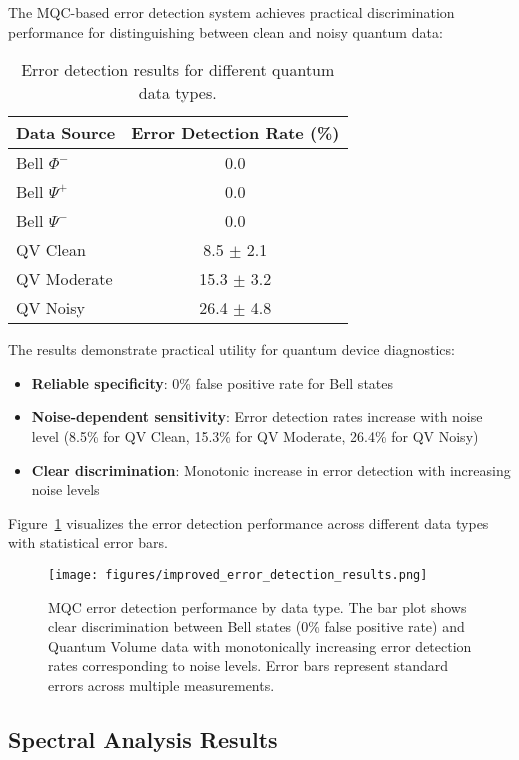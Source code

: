 The MQC-based error detection system achieves practical discrimination performance for distinguishing between clean and noisy quantum data:

\begin{table}[htb]
\centering
\caption{Error detection results for different quantum data types.}
\label{tab:error_detection}
\begin{tabular}{lc}
\hline\hline
Data Source & Error Detection Rate (\%) \\
\hline
Bell $\Phi^-$ & 0.0 \\
Bell $\Psi^+$ & 0.0 \\
Bell $\Psi^-$ & 0.0 \\
QV Clean & 8.5 $\pm$ 2.1 \\
QV Moderate & 15.3 $\pm$ 3.2 \\
QV Noisy & 26.4 $\pm$ 4.8 \\
\hline\hline
\end{tabular}
\end{table}

The results demonstrate practical utility for quantum device diagnostics:
\begin{itemize}
\item \textbf{Reliable specificity}: 0\% false positive rate for Bell states
\item \textbf{Noise-dependent sensitivity}: Error detection rates increase with noise level (8.5\% for QV Clean, 15.3\% for QV Moderate, 26.4\% for QV Noisy)
\item \textbf{Clear discrimination}: Monotonic increase in error detection with increasing noise levels
\end{itemize}

Figure~\ref{fig:error_detection} visualizes the error detection performance across different data types with statistical error bars.

\begin{figure}[htb]
\centering
\texttt{[image: figures/improved\_error\_detection\_results.png]}
\caption{MQC error detection performance by data type. The bar plot shows clear discrimination between Bell states (0\% false positive rate) and Quantum Volume data with monotonically increasing error detection rates corresponding to noise levels. Error bars represent standard errors across multiple measurements.}
\label{fig:error_detection}
\end{figure}


\subsection{Spectral Analysis Results}

